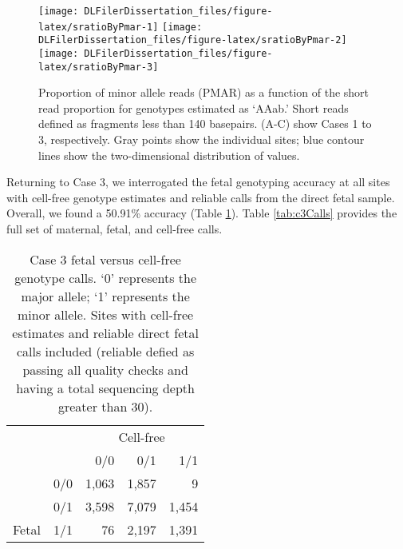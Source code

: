 \documentclass[11pt,letterpaper,oneside]{book}
\begin{document}
\begin{figure}

{\centering \texttt{[image: DLFilerDissertation\_files/figure-latex/sratioByPmar-1]} \texttt{[image: DLFilerDissertation\_files/figure-latex/sratioByPmar-2]} \texttt{[image: DLFilerDissertation\_files/figure-latex/sratioByPmar-3]} 

}

\caption[Relationship between PMAR and fraction of reads \textless140 basepairs.]{Proportion of minor allele reads (PMAR) as a function of the short read proportion for genotypes estimated as `AAab.' Short reads defined as fragments less than 140 basepairs. (A-C) show Cases 1 to 3, respectively. Gray points show the individual sites; blue contour lines show the two-dimensional distribution of values.}\label{fig:sratioByPmar}
\end{figure}

Returning to Case 3, we interrogated the fetal genotyping accuracy at all sites with cell-free genotype estimates and reliable calls from the direct fetal sample.
Overall, we found a 50.91\% accuracy (Table \ref{tab:c3FetByCf}).
Table \ref{tab:c3Calls} provides the full set of maternal, fetal, and cell-free calls.





\begin{table}

\caption[Case 3 fetal versus cell-free genotype calls.]{\label{tab:c3FetByCf}Case 3 fetal versus cell-free genotype calls. `0' represents the major allele; `1' represents the minor allele. Sites with cell-free estimates and reliable direct fetal calls included (reliable defied as passing all quality checks and having a total sequencing depth greater than 30).}
\centering
\begin{tabular}[t]{llrrr}
\toprule
\multicolumn{2}{c}{ } & \multicolumn{3}{c}{Cell-free} \\
\cmidrule(l{3pt}r{3pt}){3-5}
  &   & 0/0 & 0/1 & 1/1\\
\midrule
 & 0/0 & 1,063 & 1,857 & 9\\
\cmidrule{2-5}
 & 0/1 & 3,598 & 7,079 & 1,454\\
\cmidrule{2-5}
\multirow{-3}{*}{\raggedright\arraybackslash Fetal} & 1/1 & 76 & 2,197 & 1,391\\
\bottomrule
\end{tabular}
\end{table}
\end{document}
